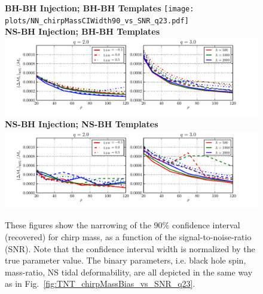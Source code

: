 \documentclass[aps,prd,amsmath,floats,floatfix, twocolumn,
superscriptaddress,nofootinbib,showpacs]{revtex4-1}
\begin{document}
\begin{figure}[h]
	\centering 
	\textbf{BH-BH Injection; BH-BH Templates}
	\texttt{[image: plots/NN\_chirpMassCIWidth90\_vs\_SNR\_q23.pdf]}\\ 
	\textbf{NS-BH Injection; BH-BH Templates}
	\includegraphics[width=1.85\columnwidth]{plots/TN_chirpMassCIWidth90_vs_SNR_q23.pdf}\\ 
	\textbf{NS-BH Injection; NS-BH Templates}
	\includegraphics[width=1.85\columnwidth]{plots/TT_chirpMassCIWidth90_vs_SNR_q23.pdf}%
	\caption{These figures show the narrowing of the $90\%$ confidence 
		interval (recovered) for chirp mass, as a function of the 
		signal-to-noise-ratio (SNR). Note that the confidence interval
                width is normalized by the true parameter value.
                The binary parameters, i.e. black hole spin,
                mass-ratio, NS tidal deformability, are all depicted in the 
                same way as in Fig.~\ref{fig:TNT_chirpMassBias_vs_SNR_q23}.
	}
	\label{fig:TNT_chirpMassCIWidth90_vs_SNR_q23}
\end{figure}
% 
\end{document}
